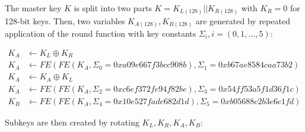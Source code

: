 The master key $K$ is split into two parts $K=K_{L(128)}||K_{R(128)}$ with
$K_R=0$ for 128-bit keys. Then, two variables $K_{A(128)},K_{B(128)}$ are
generated by repeated application of the round function with key constants
$\Sigma_i,i=(0,1,\dots,5)$:

\begin{align*}
    K_A&\leftarrow K_L\oplus K_R \\
    K_A&\leftarrow FE(FE(K_A, \Sigma_0=0xa09e667f3bcc908b), \Sigma_1=0xb67ae8584caa73b2) \\
    K_A&\leftarrow K_A\oplus K_L \\
    K_A&\leftarrow FE(FE(K_A, \Sigma_2=0xc6ef372fe94f82be), \Sigma_3=0x54ff53a5f1d36f1c) \\
    K_B&\leftarrow FE(FE(K_A, \Sigma_4=0x10e527fade682d1d), \Sigma_5=0xb05688c2b3e6c1fd)
\end{align*}

Subkeys are then created by rotating $K_L,K_R,K_A,K_B$:

